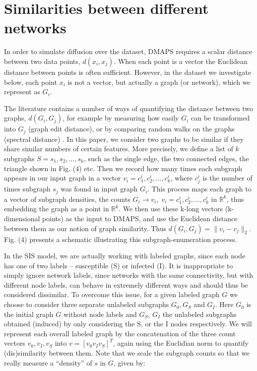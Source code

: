 \section{Similarities between different networks}

In order to simulate diffusion over the dataset, DMAPS requires a
scalar distance between two data points, $d(x_i, x_j)$. When each
point is a vector the Euclidean distance between points is often
sufficient. However, in the dataset we investigate below, each point
$x_i$ is not a vector, but actually a graph (or network), which we
represent as $G_i$.

The literature contains a number of ways of quantifying the distance
between two graphs, $d(G_i, G_j)$, for example by measuring how easily
$G_i$ can be transformed into $G_j$ (graph edit distance), or by
comparing random walks on the graphs (spectral distance)
\cite{bunke_graph_1998,gao_survey_2010,papadimitriou_web_2010,vishwanathan_graph_2010}. In
this paper, we consider two graphs to be similar if they share similar
numbers of certain features. More precisely, we define a list of $k$
subgraphs $S = {s_1, s_2, \dots, s_k}$, such as the single edge, the
two connected edges, the triangle shown in Fig. (4) etc. Then we
record how many times each subgraph appears in our input graph in a
vector $v_i = {c_1^i, c_2^i, \dots, c_k^i}$, where $c_j^i$ is the
number of times subgraph $s_j$ was found in input graph $G_i$. This
process maps each graph to a vector of subgraph densities, the counts
$G_i \rightarrow v_i, \; v_i = {c_1^i, c_2^i, \dots, c_k^i}$ in
$\mathbb{R}^k$, thus embedding the graph as a point in
$\mathbb{R}^k$. We then use these k-long vectors (k-dimensional
points) as the input to DMAPS, and use the Euclidean distance between
them as our notion of graph similarity. Thus
$d(G_i, G_j) = \| v_i - v_j \|_2$. Fig. (4) presents a schematic
illustrating this subgraph-enumeration process.


In the SIS model, we are actually working with labeled graphs, since
each node has one of two labels – susceptible (S) or infected (I). It
is inappropriate to simply ignore network labels, since networks with
the same connectivity, but with different node labels, can behave in
extremely different ways and should thus be considered dissimilar. To
overcome this issue, for a given labeled graph $G$ we choose to
consider three separate unlabeled subgraphs $G_0, G_S$ and $G_I$. Here
$G_0$ is the initial graph $G$ without node labels and $G_S$, $G_I$
the unlabeled subgraphs obtained (induced) by only considering the S,
or the I nodes respectively. We will represent each overall labeled
graph by the concatenation of the three count vectors $v_0, v_I, v_S$
into $v = [v_0 v_I v_S]^T$, again using the Euclidian norm to quantify (dis)similarity
between them. Note that we scale the subgraph counts so that we really
measure a “density” of $s$ in $G$, given by:

